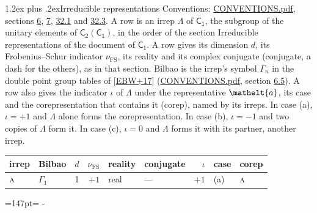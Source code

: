 \documentclass[10pt,a4paper]{article}
\makeatletter
\renewcommand\section{\@startsection{section}{1}{\z@}{-3ex plus -1ex minus -.2ex}%
  {1.2ex plus .2ex}{\normalfont\large\sffamily\bfseries\color{parttitle}}}
\newcommand{\needspace}[1]{\par\penalty-100\begingroup\dimen0=#1\relax\dimen2=\pagegoal
  \advance\dimen2-\pagetotal\ifdim\dimen0>\dimen2\relax\ifdim\dimen2>0pt\vfil\break\fi\fi
  \endgroup}
\numberwithin{equation}{section}
\newcommand{\eltfont}[1]{{\let\sigma\eltsigma\mathelt{#1}}}
\newcommand{\grp}[1]{\mathsf{#1}}
\newcommand{\irr}[1]{\text{\normalfont\scshape #1}}
\newcommand{\elt}[1]{\eltfont{#1}}
\newcommand{\fsind}{\nu_{\mathrm{FS}}}
\makeatother
\begin{document}
\section{Irreducible representations}\label{s:irreps}
Conventions: \href{../../CONVENTIONS.pdf}{CONVENTIONS.pdf}, sections \href{../../../rotation/CONVENTIONS.pdf\#conv.6}{6}, \href{../../../rotation/CONVENTIONS.pdf\#conv.7}{7}, \href{../../CONVENTIONS.pdf\#conv.32.1}{32.1} and \href{../../CONVENTIONS.pdf\#conv.32.3}{32.3}.
\leavevmode\label{n:irrep.Delta}A row is an irrep $\Lambda$ of $\grp{C_{1}}$, the subgroup of the unitary elements of $\grp{C_{2}}(\grp{C_{1}})$, in the order of the section Irreducible representations of the document of \href{../../../rotation/data/pdf/C1.pdf}{$\grp{C_{1}}$}. \label{n:index.dimension}\label{n:index.frobenius}\label{n:head.irrep}\label{n:head.reality}\label{n:head.conjugate}A row gives its dimension $d$, its Frobenius--Schur indicator $\fsind$, its reality and its complex conjugate (conjugate, a dash for the others), as in that section. \label{n:head.bilbao}\label{n:irrep.alias.gamma}Bilbao is the irrep's symbol $\Gamma_n$ in the double point group tables of [\href{../../../REFERENCES.pdf\#ref.EBW+17}{EBW+17}] (\href{../../CONVENTIONS.pdf}{CONVENTIONS.pdf}, section \href{../../../rotation/CONVENTIONS.pdf\#conv.6.5}{6.5}). \label{n:head.case.corep}\label{n:head.corep}A row also gives the indicator $\iota$ of $\Lambda$ under the representative $\elt{a}$, its case and the corepresentation that contains it (corep), named by its irreps. In case (a), $\iota = +1$ and $\Lambda$ alone forms the corepresentation. In case (b), $\iota = -1$ and two copies of $\Lambda$ form it. In case (c), $\iota = 0$ and $\Lambda$ forms it with its partner, another irrep.
\setlength{\emergencystretch}{2em}\par\setlength{\emergencystretch}{0pt}
{\small\renewcommand{\arraystretch}{1.25}\setlength{\tabcolsep}{4pt}\begin{longtable}{@{}llrrllrll@{}}\toprule
irrep & Bilbao & $d$ & $\fsind$ & reality & conjugate & $\iota$ & case & corep\\\midrule\endhead
\bottomrule\endfoot\endlastfoot
$\irr{a}$ & $\Gamma_{1}$ & 1 & $+1$ & real & --- & $+1$ & (a) & $\irr{a}$\\
\bottomrule\end{longtable}}
\needspace{147pt}
\end{document}
